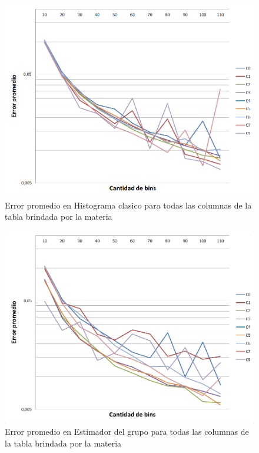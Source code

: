 	
\begin{figure}[H]
	    \includegraphics[scale=.60]{imagenes/variacion_parametro_y_columna_histo.png}
	    \caption{Error promedio en Histograma clasico para todas las columnas de la tabla brindada por la materia} 
	    \label{fig:variacion_parametro_y_columna_histo}
\end{figure}

\begin{figure}[H]
	    \includegraphics[scale=.60]{imagenes/variacion_parametro_y_columna_grupo.png}
	    \caption{Error promedio en Estimador del grupo para todas las columnas de la tabla brindada por la materia} 
	    \label{fig:variacion_parametro_y_columna_grupo}
\end{figure}

